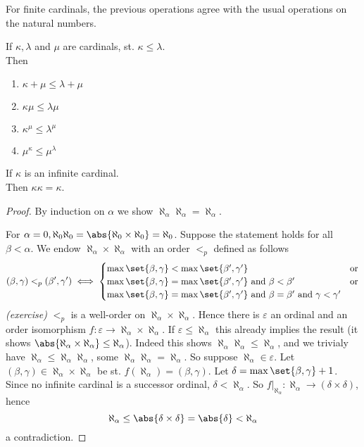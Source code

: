 \begin{remark}
    For finite cardinals, the previous operations agree with the usual operations on the natural numbers.
\end{remark}

\begin{proposition}
    If $\kappa, \lambda$ and $\mu$ are cardinals, st. $\kappa \leq \lambda$.\\
    Then 
    \begin{enumerate}
        \item $\kappa + \mu \leq \lambda + \mu$
        \item $\kappa \mu \leq \lambda \mu$
        \item $\kappa^\mu \leq \lambda^\mu$
        \item $\mu^\kappa \leq \mu^\lambda$
    \end{enumerate}
\end{proposition}

\begin{theorem}[Hessenberg]\label{thm:hessenberg}
    If $\kappa$ is an infinite cardinal.\\
    Then $\kappa\kappa = \kappa$.
\end{theorem}
\begin{proof}
    By induction on $\alpha$ we show $\aleph_\alpha \aleph_\alpha = \aleph_\alpha$.

    For $\alpha =0, \aleph_0 \aleph_0 = \abs{\aleph_0 \times \aleph_0} = \aleph_0$. Suppose the statement holds for all $\beta < \alpha$.
    We endow $\aleph_\alpha \times \aleph_\alpha$ with an order $<_p$ defined as follows
    $$ (\beta, \gamma) <_p (\beta', \gamma') \iff \begin{cases}
        \max \set{\beta, \gamma} < \max \set{\beta', \gamma'}& \text{or}\\
        \max \set{\beta, \gamma} = \max \set{\beta', \gamma'} \text{ and } \beta < \beta' & \text{or}\\
        \max \set{\beta, \gamma} = \max \set{\beta', \gamma'} \text{ and } \beta = \beta' \text{ and } \gamma < \gamma'
    \end{cases}$$
    \emph{(exercise)} $<_p$ is a well-order on $\aleph_\alpha \times \aleph_\alpha$. Hence there is $\varepsilon$ an ordinal
    and an order isomorphism $f: \varepsilon \to \aleph_\alpha \times \aleph_\alpha$. If $\varepsilon \leq \aleph_\alpha$ this
    already implies the result (it shows $\abs{\aleph_\alpha \times \aleph_\alpha} \leq \aleph_\alpha$). Indeed this shows 
    $\aleph_\alpha \aleph_\alpha \leq \aleph_\alpha$, and we trivialy have $\aleph_\alpha \leq \aleph_\alpha \aleph_\alpha$, some
    $\aleph_\alpha \aleph_\alpha = \aleph_\alpha$.
    So suppose $\aleph_\alpha \in \varepsilon$. Let $(\beta, \gamma) \in \aleph_\alpha \times \aleph_\alpha$ be st. 
    $f(\aleph_\alpha) = (\beta, \gamma)$. Let $\delta = \max \set{\beta, \gamma} + 1$. Since no infinite cardinal is a successor
    ordinal, $\delta < \aleph_\alpha$. So $ f|_{\aleph_\alpha} : \aleph_\alpha \to (\delta \times \delta)$, hence
    $$ \aleph_\alpha \leq \abs{\delta \times \delta} = \abs{\delta} < \aleph_\alpha$$ a contradiction. 
\end{proof}

